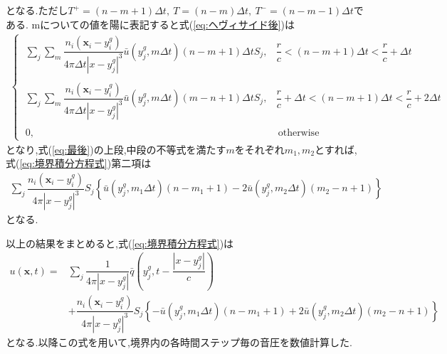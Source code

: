 \documentclass[dvipdfmx]{ampbt}
\begin{document}
となる.ただし$T^+ =(n-m+1)\Delta t,\ T =(n-m)\Delta t,\ T^- =(n-m-1)\Delta t$である.
mについての値を陽に表記すると式(\ref{eq:ヘヴィサイド後})は
\begin{align}
\begin{cases}
  \label{eq:最後}
\; \displaystyle\sum_j \sum_m \dfrac{n_i(\bm{x}_i-y^g_i)}{4\pi \Delta t |x-y^g_j|^3}  \bar{u}(y^g_j,m\Delta t)(n-m+1)\Delta t S_j, &\dfrac{r}{c} < (n-m+1)\Delta t < \dfrac{r}{c}+\Delta t \\  \\
\; \displaystyle\sum_j \sum_m \dfrac{n_i(\bm{x}_i-y^g_i)}{4\pi \Delta t |x-y^g_j|^3}  \bar{u}(y^g_j,m\Delta t)(m-n+1)\Delta t S_j, &\dfrac{r}{c}+\Delta t < (n-m+1)\Delta t < \dfrac{r}{c}+2\Delta t\\  \\
\; 0, &\ \mbox{otherwise}
\end{cases}
\end{align}
となり,式(\ref{eq:最後})の上段,中段の不等式を満たす$m$をそれぞれ$m_1,m_2$とすれば,式(\ref{eq:境界積分方程式})第二項は
\begin{align}
\label{eq:最後の最後}
\displaystyle\sum_j \dfrac{n_i(\bm{x}_i-y^g_i)}{4\pi |x-y^g_j|^3} S_j \left\{  \bar{u}(y^g_j,m_1\Delta t)(n-m_1+1)
-2 \bar{u}(y^g_j,m_2\Delta t)(m_2-n+1)\right\}
\end{align}
となる.\par
以上の結果をまとめると,式(\ref{eq:境界積分方程式})は
\begin{align}
\label{eq:境界積分方程式の変形後}
u(\bm{x},t) = &\sum_j  \dfrac{1}{4\pi|x-y_j^g|} \bar{q}(y_j^g,t-\dfrac{|x-y_j^g|}{c}) \nonumber\\
 &+ \dfrac{n_i(\bm{x}_i-y^g_i)}{4\pi |x-y^g_j|^3} S_j \left\{  -\bar{u}(y^g_j,m_1\Delta t)(n-m_1+1)
 +2 \bar{u}(y^g_j,m_2\Delta t)(m_2-n+1)\right\}
\end{align}
となる.以降この式を用いて,境界内の各時間ステップ毎の音圧を数値計算した.
\end{document}
